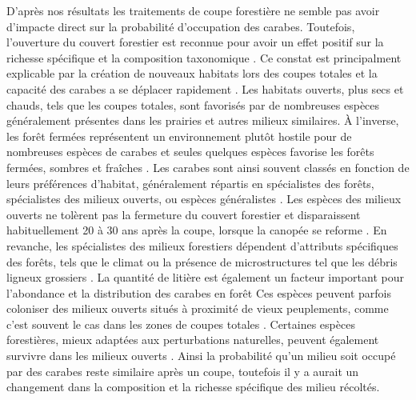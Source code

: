 D'après nos résultats les traitements de coupe forestière ne semble pas avoir d'impacte direct sur la probabilité d'occupation des carabes.
Toutefois, l'ouverture du couvert forestier est reconnue pour avoir un effet positif sur la richesse spécifique et la composition taxonomique \citep{Halme1993Carabidbeetles,Heliola2001Distributioncarabid,Koivula2002Alternativeharvesting}.
Ce constat est principalment explicable par la création de nouveaux habitats lors des coupes totales et la capacité des carabes a se déplacer rapidement \citep{Niemela2007effectsforestry}. 
Les habitats ouverts, plus secs et chauds, tels que les coupes totales, sont favorisés par de nombreuses espèces généralement présentes dans les prairies et autres milieux similaires. 
À l'inverse, les forêt fermées représentent un environnement plutôt hostile pour de nombreuses espèces de carabes et seules quelques espèces favorise les forêts fermées, sombres et fraîches \citep{Niemela1993Effectsclearcut,Koivula2002Borealcarabidbeetle}.
Les carabes sont ainsi souvent classés en fonction de leurs préférences d'habitat, généralement répartis en spécialistes des forêts, spécialistes des milieux ouverts, ou espèces généralistes \citep{Niemela2007effectsforestry}. 
Les espèces des milieux ouverts ne tolèrent pas la fermeture du couvert forestier et disparaissent habituellement 20 à 30 ans après la coupe, lorsque la canopée se reforme \citep{Niemela1996importancesmallscale,Koivula2002Alternativeharvesting}.  
En revanche, les spécialistes des milieux forestiers dépendent d'attributs spécifiques des forêts, tels que le climat ou la présence de microstructures tel que les débris ligneux grossiers \citep{Niemela1996importancesmallscale,Heliola2001Distributioncarabid,Koivula2002Alternativeharvesting,Work2004Standcomposition}. 
La quantité de litière est également un facteur important pour l'abondance et la distribution des carabes en forêt \citep{Koivula.1999Leaflitter,Heliola2001Distributioncarabid,Magura2005ImpactsLeaflitter}
Ces espèces peuvent parfois coloniser des milieux ouverts situés à proximité de vieux peuplements, comme c’est souvent le cas dans les zones de coupes totales \citep{Spence1996Northernforestry,Koivula2002Alternativeharvesting}. 
Certaines espèces forestières, mieux adaptées aux perturbations naturelles, peuvent également survivre dans les milieux ouverts \citep{Niemela2007effectsforestry}. 
Ainsi la probabilité qu'un milieu soit occupé par des carabes reste similaire après un coupe, toutefois il y a aurait un changement dans la composition et la richesse spécifique des milieu récoltés. 

